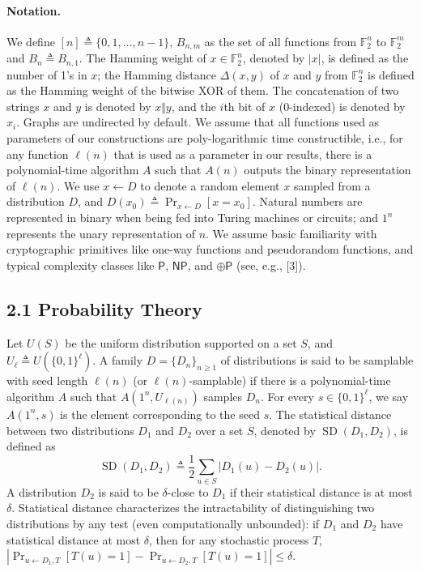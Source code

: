 \documentclass[10pt,a4paper]{article}
\begin{document}
\paragraph{Notation.} We define $[n]\triangleq\{0,1,\ldots,n-1\}$, $B_{n,m}$ as the set of all functions from $\mathbb F_2^n$ to $\mathbb F_2^m$ and $B_n\triangleq B_{n,1}$. The Hamming weight of $x\in\mathbb F_2^n$, denoted by $|x|$, is defined as the number of 1's in $x$; the Hamming distance $\Delta(x,y)$ of $x$ and $y$ from $\mathbb F_2^n$ is defined as the Hamming weight of the bitwise XOR of them. The concatenation of two strings $x$ and $y$ is denoted by $x\Vert y$, and the $i$th bit of $x$ (0-indexed) is denoted by $x_i$. Graphs are undirected by default. We assume that all functions used as parameters of our constructions are poly-logarithmic time constructible, i.e., for any function $\ell(n)$ that is used as a parameter in our results, there is a polynomial-time algorithm $A$ such that $A(n)$ outputs the binary representation of $\ell(n)$.
We use $x\leftarrow D$ to denote a random element $x$ sampled from a distribution $D$, and $D(x_0)\triangleq\Pr_{x\leftarrow D}[x=x_0]$. Natural numbers are represented in binary when being fed into Turing machines or circuits; and $1^n$ represents the unary representation of $n$. We assume basic familiarity with cryptographic primitives like one-way functions and pseudorandom functions, and typical complexity classes like $\mathsf P$, $\mathsf{NP}$, and $\oplus\mathsf P$ (see, e.g., [3]).
\subsection*{2.1 Probability Theory}
Let $U(S)$ be the uniform distribution supported on a set $S$, and $U_\ell\triangleq U(\{0,1\}^\ell)$. A family $D=\{D_n\}_{n\ge1}$ of distributions is said to be samplable with seed length $\ell(n)$ (or $\ell(n)$-samplable) if there is a polynomial-time algorithm $A$ such that $A(1^n,U_{\ell(n)})$ samples $D_n$. For every $s\in\{0,1\}^\ell$, we say $A(1^n,s)$ is the element corresponding to the seed $s$.
The statistical distance between two distributions $D_1$ and $D_2$ over a set $S$, denoted by $\operatorname{SD}(D_1,D_2)$, is defined as
\[\operatorname{SD}(D_1,D_2)\triangleq\frac12\sum_{u\in S}|D_1(u)-D_2(u)|.\]
A distribution $D_2$ is said to be $\delta$-close to $D_1$ if their statistical distance is at most $\delta$. Statistical distance characterizes the intractability of distinguishing two distributions by any test (even computationally unbounded): if $D_1$ and $D_2$ have statistical distance at most $\delta$, then for any stochastic process $T$, $|\Pr_{u\leftarrow D_1,T}[T(u)=1]-\Pr_{u\leftarrow D_2,T}[T(u)=1]|\le\delta$.
\end{document}
